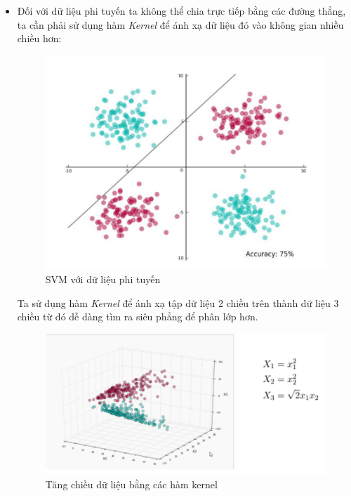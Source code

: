 \documentclass[a4paper, 12pt]{article}
\begin{document}
\begin{itemize}
    \item Đối với dữ liệu phi tuyến ta không thể chia trực tiếp bằng các đường thẳng, ta cần phải sử dụng hàm \textit{Kernel} để ánh xạ dữ liệu đó vào không gian nhiều chiều hơn:
    \begin{figure}[H]
        \begin{center}
            \includegraphics[scale=0.3]{img/SVM-kernel-1}
            \caption{SVM với dữ liệu phi tuyến}
        \end{center}
    \end{figure}
    \subitem Ta sử dụng hàm \textit{Kernel} để ánh xạ tập dữ liệu 2 chiều trên thành dữ liệu 3 chiều từ đó dễ dàng tìm ra siêu phẳng để phân lớp hơn.
    \begin{figure}[H]
        \begin{center}
            \includegraphics[scale=0.3]{img/SVM-kernel-2}
            \caption{Tăng chiều dữ liệu bằng các hàm kernel}
        \end{center}
    \end{figure}
\end{itemize}
\end{document}
